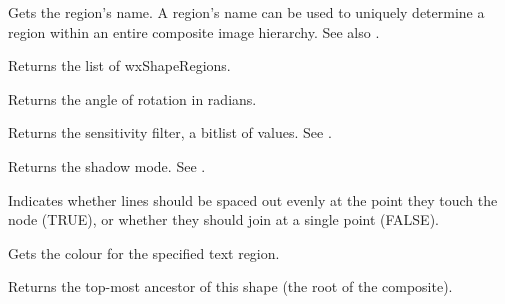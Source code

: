 \label{getregionname}


Gets the region's name. A region's name can be used to uniquely determine a region within
an entire composite image hierarchy. See also .

\label{getregions}


Returns the list of wxShapeRegions.



Returns the angle of rotation in radians.



Returns the sensitivity filter, a bitlist of values. See .



Returns the shadow mode. See .



Indicates whether lines should be spaced out evenly at the point they touch the node (TRUE), or whether they
should join at a single point (FALSE).



Gets the colour for the specified text region.



Returns the top-most ancestor of this shape (the root of the composite).



